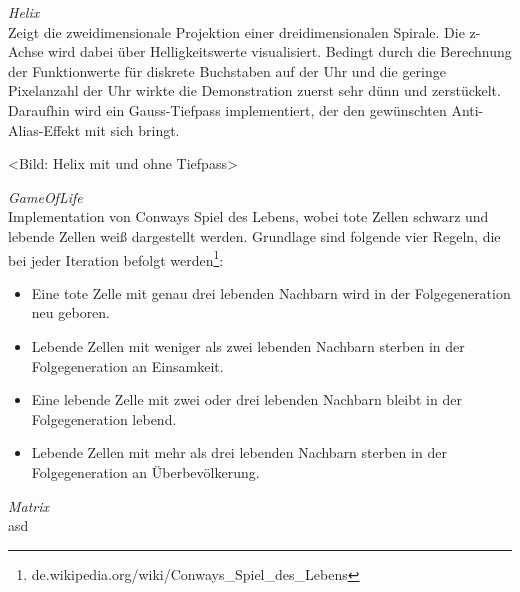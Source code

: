\emph{Helix} \\
Zeigt die zweidimensionale Projektion einer dreidimensionalen Spirale. Die z-Achse wird dabei über Helligkeitswerte visualisiert.
Bedingt durch die Berechnung der Funktionwerte für diskrete Buchstaben auf der Uhr und die geringe Pixelanzahl der Uhr wirkte die Demonstration zuerst sehr dünn und zerstückelt.
Daraufhin wird ein Gauss-Tiefpass implementiert, der den gewünschten Anti-Alias-Effekt mit sich bringt.

<Bild: Helix mit und ohne Tiefpass>

\emph{GameOfLife} \\
Implementation von Conways Spiel des Lebens, wobei tote Zellen schwarz und lebende Zellen weiß dargestellt werden.
Grundlage sind folgende vier Regeln, die bei jeder Iteration befolgt werden\footnote{de.wikipedia.org/wiki/Conways\_Spiel\_des\_Lebens}:
\begin{itemize}
    \item Eine tote Zelle mit genau drei lebenden Nachbarn wird in der Folgegeneration neu geboren.
    \item Lebende Zellen mit weniger als zwei lebenden Nachbarn sterben in der Folgegeneration an Einsamkeit.
    \item Eine lebende Zelle mit zwei oder drei lebenden Nachbarn bleibt in der Folgegeneration lebend.
    \item Lebende Zellen mit mehr als drei lebenden Nachbarn sterben in der Folgegeneration an Überbevölkerung.
\end{itemize}

\emph{Matrix} \\
asd



